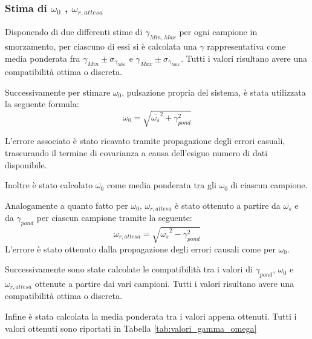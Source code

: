\documentclass[a4paper,11pt,oneside]{article}
\begin{document}
\subsubsection{Stima di $\omega_{0}$ , $\omega_{r, attesa}$}
Disponendo di due differenti stime di $\gamma_{Min, Max}$ per ogni campione in smorzamento, per ciascuno di essi si è calcolata una $\gamma$ rappresentativa come media ponderata fra $\gamma_{Min}\pm \sigma_{\gamma_{Min}}$ e $\gamma_{Max}\pm \sigma_{\gamma_{Max}}$.
Tutti i valori risultano avere una compatibilità ottima o discreta.

Successivamente per stimare $\omega_0$, pulsazione propria del sistema, è stata utilizzata la seguente formula:
\begin{equation*}
    \omega_{0} = \sqrt{\overline{\omega_{s}}^2+\gamma_{pond}^2}
\end{equation*}

L'errore associato è stato ricavato tramite propagazione degli errori casuali, trascurando il termine di covarianza a causa dell'esiguo numero di dati disponibile.

Inoltre è stato calcolato $\overline{\omega_0}$ come media ponderata tra gli $\omega_0$ di ciascun campione.

Analogamente a quanto fatto per $\omega_0$, $\omega_{r,attesa}$ è stato ottenuto a partire da $\overline{\omega_s}$ e da $\gamma_{pond}$ per ciascun campione tramite la seguente: 
\begin{equation*}
    \omega_{r,attesa} = \sqrt{\overline{\omega_{s}}^2-\gamma_{pond}^2}
\end{equation*}
L'errore è stato ottenuto dalla propagazione degli errori causali come per $\omega_0$. 

Successivamente sono state calcolate le compatibilità tra i valori di $\gamma_{pond}$, $\omega_0$ e $\omega_{r,attesa}$ ottenute a partire dai vari campioni. Tutti i valori risultano avere una compatibilità ottima o discreta.

Infine è stata calcolata la media ponderata tra i valori appena ottenuti. Tutti i valori ottenuti sono riportati in Tabella \ref{tab:valori_gamma_omega}
\end{document}
